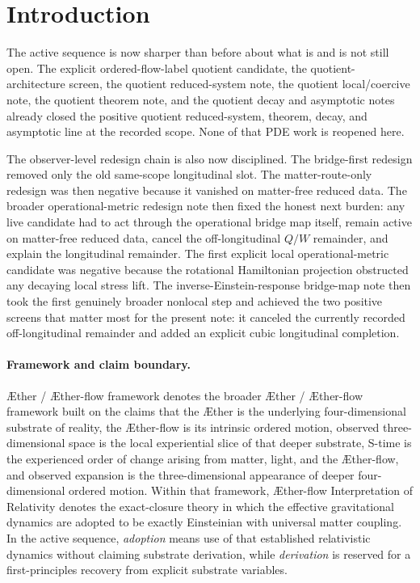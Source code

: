 \documentclass[11pt]{article}
\newcommand{\Aether}{\AE{}ther}
\newcommand{\Aflow}{\AE{}ther-flow}
\newcommand{\TheoryName}{\Aflow{} Interpretation of Relativity}
\newcommand{\TheoryProgram}{\Aether{} / \Aflow{} framework}
\begin{document}
\section{Introduction}

The active sequence is now sharper than before about what is and is not still open. The explicit ordered-flow-label quotient candidate, the quotient-architecture screen, the quotient reduced-system note, the quotient local/coercive note, the quotient theorem note, and the quotient decay and asymptotic notes already closed the positive quotient reduced-system, theorem, decay, and asymptotic line at the recorded scope. None of that PDE work is reopened here.

The observer-level redesign chain is also now disciplined. The bridge-first redesign removed only the old same-scope longitudinal slot. The matter-route-only redesign was then negative because it vanished on matter-free reduced data. The broader operational-metric redesign note then fixed the honest next burden: any live candidate had to act through the operational bridge map itself, remain active on matter-free reduced data, cancel the off-longitudinal \(Q/W\) remainder, and explain the longitudinal remainder. The first explicit local operational-metric candidate was negative because the rotational Hamiltonian projection obstructed any decaying local stress lift. The inverse-Einstein-response bridge-map note then took the first genuinely broader nonlocal step and achieved the two positive screens that matter most for the present note: it canceled the currently recorded off-longitudinal remainder and added an explicit cubic longitudinal completion.

\paragraph{Framework and claim boundary.}
\TheoryProgram{} denotes the broader \Aether{} / \Aflow{} framework built on the claims that the \Aether{} is the underlying four-dimensional substrate of reality, the \Aflow{} is its intrinsic ordered motion, observed three-dimensional space is the local experiential slice of that deeper substrate, S-time is the experienced order of change arising from matter, light, and the \Aflow{}, and observed expansion is the three-dimensional appearance of deeper four-dimensional ordered motion. Within that framework, \TheoryName{} denotes the exact-closure theory in which the effective gravitational dynamics are adopted to be exactly Einsteinian with universal matter coupling. In the active sequence, \emph{adoption} means use of that established relativistic dynamics without claiming substrate derivation, while \emph{derivation} is reserved for a first-principles recovery from explicit substrate variables.
\end{document}
